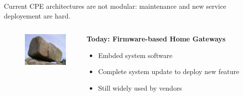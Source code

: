 \documentclass[a4paper]{beamer}
\begin{document}
\begin{frame}{Current CPE architectures are not modular: maintenance and new service deployement are hard.}
										
	\begin{columns}[T]
		\begin{column}{.01\textwidth} %
		\end{column}
		\begin{column}[T]{0.15 \textwidth} 
			\vspace{1em}
			\includegraphics[width=6em]{monolith.jpg}
		\end{column}
																						
																										
		\begin{column}[T]{0.70 \textwidth} 
																																							
																																								   
			\textbf{Today: Firmware-based Home Gateways}
			\begin{itemize}
				\item Embded system software
				\item Complete system update to deploy new feature
				\item Still widely used by vendors
			\end{itemize}
			\vspace{5mm}
																																								     
																																							
		\end{column}
																										
	\end{columns}
										
									
											
\end{frame}
\end{document}
